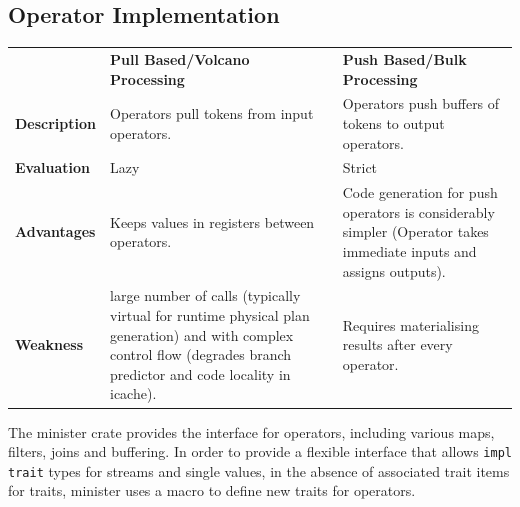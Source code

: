\subsection{Operator Implementation}
\begin{center}
    \begin{tabular}{l p{} p{}}
                             & \textbf{Pull Based/Volcano Processing}                                                                                                                                & \textbf{Push Based/Bulk Processing}                                                                               \\
        \textbf{Description} & Operators pull tokens from input operators.                                                                                                                           & Operators push buffers of tokens to output operators.                                                             \\
        \textbf{Evaluation}  & Lazy                                                                                                                                                                  & Strict                                                                                                            \\
        \textbf{Advantages}  & Keeps values in registers between operators.                                                                                                                          & Code generation for push operators is considerably simpler (Operator takes immediate inputs and assigns outputs). \\
        \textbf{Weakness}    & large number of calls (typically virtual for runtime physical plan generation) and with complex control flow (degrades branch predictor and code locality in icache). & Requires materialising results after every operator.                                                              \\
    \end{tabular}
\end{center}
The minister crate provides the interface for operators, including various maps, filters, joins and buffering. In order to provide a flexible interface that allows \texttt{impl trait}
types for streams and single values, in the absence of associated trait items for traits, minister uses a macro to define new traits for operators.
\\
